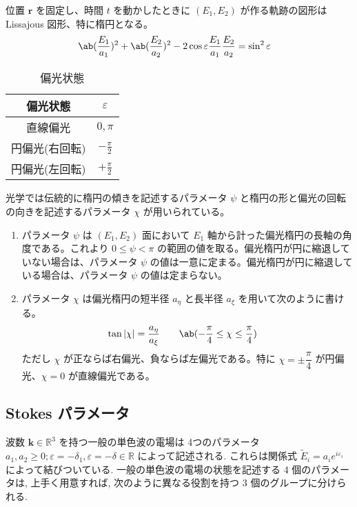 \documentclass[uplatex,dvipdfmx,a4paper,11pt]{jlreq}
\newcommand{\RR}{\mathbb{R}}
\newcommand{\rr}{\bm{r}}
\newcommand{\kk}{\bm{k}}
\theoremstyle{definition}
\begin{document}
\begin{proposition}
  位置 $\rr$ を固定し、時間 $t$ を動かしたときに $(E_1, E_2)$ が作る軌跡の図形は Lissajous 図形、特に楕円となる。
  \begin{align}
    \ab(\frac{E_1}{a_1})^2 + \ab(\frac{E_2}{a_2})^2 - 2\cos\varepsilon\frac{E_1}{a_1}\frac{E_2}{a_2} & = \sin^2{\varepsilon}
  \end{align}
\end{proposition}

\begin{table}[hbtp]
  \centering
  \begin{tabular}{|c|c|}
    \hline
    偏光状態     & $\varepsilon$    \\
    \hline \hline
    直線偏光     & $0, \pi$         \\
    円偏光(右回転) & $-\frac{\pi}{2}$ \\
    円偏光(左回転) & $+\frac{\pi}{2}$ \\
    \hline
  \end{tabular}
  \caption{偏光状態}
\end{table}

\begin{definition}
  光学では伝統的に楕円の傾きを記述するパラメータ $\psi$ と楕円の形と偏光の回転の向きを記述するパラメータ $\chi$ が用いられている。
  \begin{enumerate}
    \item パラメータ $\psi$ は $(E_1, E_2)$ 面において $E_1$ 軸から計った偏光楕円の長軸の角度である。これより $0 \leq \psi < \pi$ の範囲の値を取る。偏光楕円が円に縮退していない場合は、パラメータ $\psi$ の値は一意に定まる。偏光楕円が円に縮退している場合は、パラメータ $\psi$ の値は定まらない。
    \item パラメータ $\chi$ は偏光楕円の短半径 $a_\eta$ と長半径 $a_\xi$ を用いて次のように書ける。
          \begin{align}
            \tan|\chi| & = \frac{a_\eta}{a_\xi} \qquad \ab(-\frac{\pi}{4}\leq\chi\leq\frac{\pi}{4})
          \end{align}
          ただし $\chi$ が正ならば右偏光、負ならば左偏光である。特に $\chi = \pm\dfrac{\pi}{4}$ が円偏光、$\chi = 0$ が直線偏光である。
  \end{enumerate}
\end{definition}
\subsection{Stokes パラメータ}
波数 $\kk\in\RR^3$ を持つ一般の単色波の電場は 4つのパラメータ $a_1, a_2 \geq 0; \varepsilon = -\delta_1, \varepsilon = -\delta\in\RR$ によって記述される. これらは関係式 $\tilde{E}_i = a_ie^{i \varepsilon_i}$ によって結びついている. 一般の単色波の電場の状態を記述する 4 個のパラメータは, 上手く用意すれば, 次のように異なる役割を持つ 3 個のグループに分けられる.
\end{document}

